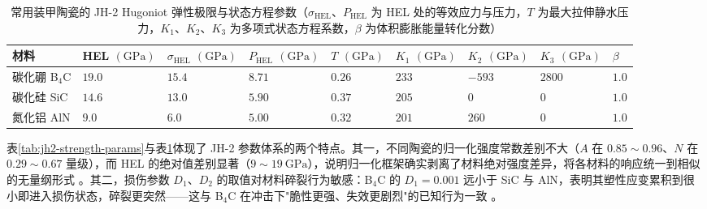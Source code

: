 \begin{table}[htbp]
  \centering
  \small
  \caption{常用装甲陶瓷的 JH-2 Hugoniot 弹性极限与状态方程参数（$\sigma_{\mathrm{HEL}}$、$P_{\mathrm{HEL}}$ 为 HEL 处的等效应力与压力，$T$ 为最大拉伸静水压力，$K_{1}$、$K_{2}$、$K_{3}$ 为多项式状态方程系数，$\beta$ 为体积膨胀能量转化分数）\cite{JohnsonHolmquist1999,HolmquistJohnson2002,HolmquistTempletonBishnoi2001}}
  \label{tab:jh2-eos-params}
  \begin{tabular}{l>{\raggedright\arraybackslash}p{}>{\raggedright\arraybackslash}p{}>{\raggedright\arraybackslash}p{}>{\raggedright\arraybackslash}p{}>{\raggedright\arraybackslash}p{}>{\raggedright\arraybackslash}p{}>{\raggedright\arraybackslash}p{}>{\raggedright\arraybackslash}p{}}
    \toprule
    材料 & \shortstack{HEL\\$(\mathrm{GPa})$} & \shortstack{$\sigma_{\mathrm{HEL}}$\\$(\mathrm{GPa})$} & \shortstack{$P_{\mathrm{HEL}}$\\$(\mathrm{GPa})$} & \shortstack{$T$\\$(\mathrm{GPa})$} & \shortstack{$K_{1}$\\$(\mathrm{GPa})$} & \shortstack{$K_{2}$\\$(\mathrm{GPa})$} & \shortstack{$K_{3}$\\$(\mathrm{GPa})$} & $\beta$ \\
    \midrule
    碳化硼 B$_{4}$C & $19.0$ & $15.4$ & $8.71$ & $0.26$ & $233$ & $-593$ & $2800$ & $1.0$ \\
    碳化硅 SiC & $14.6$ & $13.0$ & $5.90$ & $0.37$ & $205$ & $0$ & $0$ & $1.0$ \\
    氮化铝 AlN & $9.0$ & $6.0$ & $5.00$ & $0.32$ & $201$ & $260$ & $0$ & $1.0$ \\
    \bottomrule
  \end{tabular}
\end{table}

表\ref{tab:jh2-strength-params}与表\ref{tab:jh2-eos-params}体现了 JH-2 参数体系的两个特点。其一，不同陶瓷的归一化强度常数差别不大（$A$ 在 $0.85\sim0.96$、$N$ 在 $0.29\sim0.67$ 量级），而 HEL 的绝对值差别显著（$9\sim19~\mathrm{GPa}$），说明归一化框架确实剥离了材料绝对强度差异，将各材料的响应统一到相似的无量纲形式 \cite{JohnsonHolmquist1999,HolmquistJohnson2002}。其二，损伤参数 $D_{1}$、$D_{2}$ 的取值对材料碎裂行为敏感：B$_{4}$C 的 $D_{1}=0.001$ 远小于 SiC 与 AlN，表明其塑性应变累积到很小即进入损伤状态，碎裂更突然——这与 B$_{4}$C 在冲击下"脆性更强、失效更剧烈"的已知行为一致 \cite{JohnsonHolmquist1999}。

